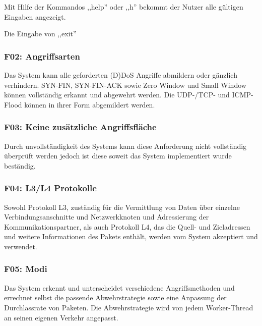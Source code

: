 \documentclass[../review_3.tex]{subfiles}
\begin{document}
Mit Hilfe der Kommandos ,,help'' oder ,,h'' bekommt der Nutzer alle gültigen Eingaben angezeigt.

Die Eingabe von ,,exit''

\subsubsection{F02: Angriffsarten}
Das System kann alle geforderten (D)DoS Angriffe abmildern oder gänzlich verhindern. SYN-FIN, SYN-FIN-ACK sowie Zero Window und Small Window können vollständig erkannt und abgewehrt werden. Die UDP-/TCP- und ICMP-Flood können in ihrer Form abgemildert werden.

\subsubsection{F03: Keine zusätzliche Angriffsfläche}
Durch unvollständigkeit des Systems kann diese Anforderung nicht vollständig überprüft werden jedoch ist diese soweit das System implementiert wurde beständig.

\subsubsection{F04: L3/L4 Protokolle}
Sowohl Protokoll L3, zuständig für die Vermittlung von Daten über einzelne Verbindungsanschnitte und Netzwerkknoten und Adressierung der Kommunikationspartner, als auch Protokoll L4, das die Quell- und Zieladressen und weitere Informationen des Pakets enthält, werden vom System akzeptiert und verwendet. 

\subsubsection{F05: Modi}
Das System erkennt und unterscheidet verschiedene Angriffsmethoden und errechnet selbst die passende Abwehrstrategie sowie eine Anpassung der Durchlassrate von Paketen. Die Abwehrstrategie wird von jedem Worker-Thread an seinen eigenen Verkehr angepasst.
\end{document}
